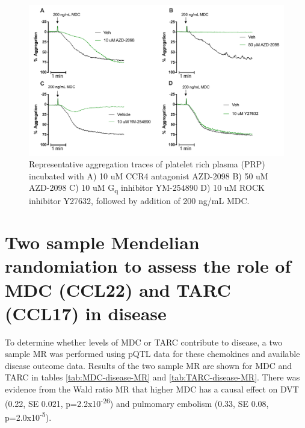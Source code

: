 \documentclass[11pt,twoside]{bristolthesis}
\begin{document}
\begin{figure}
\includegraphics[width=0.95\linewidth]{figure/Chemokines/Layouts/MDC_inhibitors_aggregation_traces} \caption[Aggregation traces of the effect of inhibitors on MDC induced platelet aggregation in PRP.]{Representative aggregation traces of platelet rich plasma (PRP) incubated with A) 10 uM CCR4 antagonist AZD-2098 B) 50 uM AZD-2098 C) 10 uM G\textsubscript{q} inhibitor YM-254890 D) 10 uM ROCK inhibitor Y27632, followed by addition of 200 ng/mL MDC.}\label{fig:MDC-PRP-agg-trace}
\end{figure}
\hypertarget{two-sample-mendelian-randomiation-to-assess-the-role-of-mdc-ccl22-and-tarc-ccl17-in-disease}{%
\section{Two sample Mendelian randomiation to assess the role of MDC (CCL22) and TARC (CCL17) in disease}\label{two-sample-mendelian-randomiation-to-assess-the-role-of-mdc-ccl22-and-tarc-ccl17-in-disease}}

To determine whether levels of MDC or TARC contribute to disease, a two sample MR was performed using pQTL data for these chemokines and available disease outcome data. Results of the two sample MR are shown for MDC and TARC in tables \ref{tab:MDC-disease-MR} and \ref{tab:TARC-disease-MR}. There was evidence from the Wald ratio MR that higher MDC has a causal effect on DVT (0.22, SE 0.021, p=2.2x10\textsuperscript{-26}) and pulmomary embolism (0.33, SE 0.08, p=2.0x10\textsuperscript{-5}).
\end{document}
